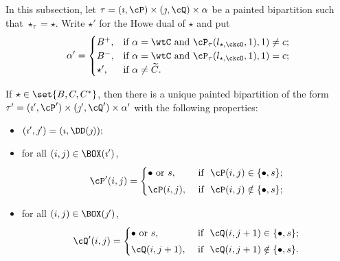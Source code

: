 \documentclass[ssunip]{subfiles}
\begin{document}
In this subsection, let $\tau=(\imath,\cP)\times (\jmath,\cQ)\times \alpha$ be a  painted bipartition such that $\star_\tau=\star$. Write $\star'$ for the Howe dual of $\star$ and put
\begin{equation} \label{eq:def.alphap}
\alpha'=\begin{cases} B^+,
& \textrm{if $\alpha = \wtC$ and $\cP_\tau(l_{\star,\ckcO},1),1) \neq c$;}\\
B^-,
& \textrm{if $\alpha = \wtC$ and $\cP_\tau(l_{\star,\ckcO},1),1)  = c$;}\\
\star', & \textrm{if $\alpha\neq \widetilde C$}. 
\end{cases}
\end{equation}
\begin{lem}\label{lemDDn1}
  If $\star \in \set{B,C,C^*}$, then there is a unique painted bipartition of the form $\tau'= (\imath',\cP')\times (\jmath',\cQ')\times \alpha'$ with the following properties:
  \begin{itemize}
        \item $
   (\imath',\jmath')= (\imath,\DD(\jmath)); \smallskip
   $
   \item for all $(i,j)\in \BOX(\imath')$,
   \[
     \cP'(i,j)=\begin{cases}   
    \bullet \textrm{ or } s,&\textrm{ if  $\ \cP(i,j)\in \{\bullet, s\}$;} \smallskip \\
  \cP(i,j),& \textrm{ if $\ \cP(i,j)\notin \{\bullet, s\}$};\end{cases}
   \]
   \item for all $(i,j)\in \BOX(\jmath')$,
   \[
     \cQ'(i,j)=\begin{cases}   
    \bullet \textrm{ or } s,&\textrm{ if  $\ \cQ(i,j+1)\in \{\bullet, s\}$;} \smallskip \\
  \cQ(i,j+1), & \textrm{ if $\ \cQ(i,j+1)\notin \{\bullet, s\}$}.  \end{cases}
   \]
    \end{itemize} 
    \end{lem}
    
\end{document}
